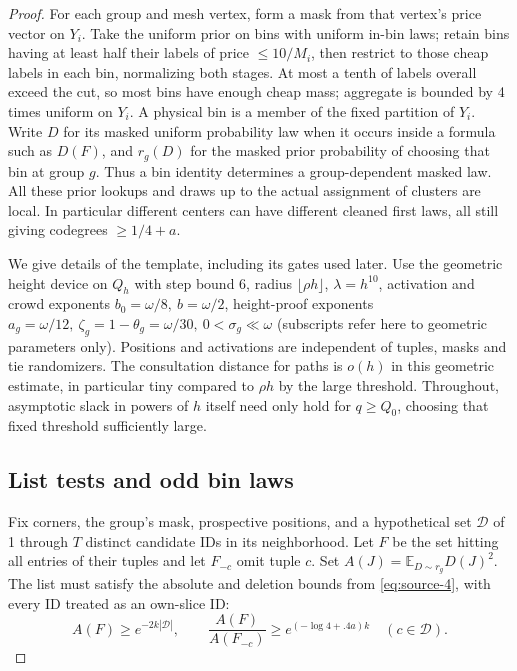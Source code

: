 \begin{proof}
For each group and mesh vertex, form a mask from that vertex's price vector on \(Y_i\). Take the uniform prior on bins with uniform in-bin laws; retain bins having at least half their labels of price \(\le10/M_i\), then restrict to those cheap labels in each bin, normalizing both stages. At most a tenth of labels overall exceed the cut, so most bins have enough cheap mass; aggregate is bounded by 4 times uniform on \(Y_i\). A physical bin is a member of the fixed partition of \(Y_i\). Write \(D\) for its masked uniform probability law when it occurs inside a formula such as \(D(F)\), and \(r_g(D)\) for the masked prior probability of choosing that bin at group \(g\). Thus a bin identity determines a group-dependent masked law. All these prior lookups and draws up to the actual assignment of clusters are local. In particular different centers can have different cleaned first laws, all still giving codegrees \(\ge1/4+a\).

We give details of the template, including its gates used later. Use the geometric height device on \(Q_h\) with step bound 6, radius \(\lfloor\rho h\rfloor\), \(\lambda=h^{10}\), activation and crowd exponents \(b_0=\omega/8,\ b=\omega/2\), height-proof exponents \(a_g=\omega/12,\ \zeta_g=1-\theta_g=\omega/30,\ 0<\sigma_g\ll\omega\) (subscripts refer here to geometric parameters only). Positions and activations are independent of tuples, masks and tie randomizers. The consultation distance for paths is \(o(h)\) in this geometric estimate, in particular tiny compared to \(\rho h\) by the large threshold. Throughout, asymptotic slack in powers of \(h\) itself need only hold for \(q\ge Q_0\), choosing that fixed threshold sufficiently large.

\subsection{List tests and odd bin laws}
\label{sec:internal-list-tests}

Fix corners, the group's mask, prospective positions, and a hypothetical set \(\mathcal D\) of 1 through \(T\) distinct candidate IDs in its neighborhood. Let \(F\) be the set hitting all entries of their tuples and let \(F_{-c}\) omit tuple \(c\). Set \(A(J)=\mathbb E_{D\sim r_g}D(J)^2\). The list must satisfy the absolute and deletion bounds from \eqref{eq:source-4}, with every ID treated as an own-slice ID:
\[
 A(F)\ge e^{-2k|\mathcal D|},\qquad
 \frac{A(F)}{A(F_{-c})}\ge e^{(-\log4+.4a)k}
 \quad(c\in\mathcal D).
\]


\end{proof}
